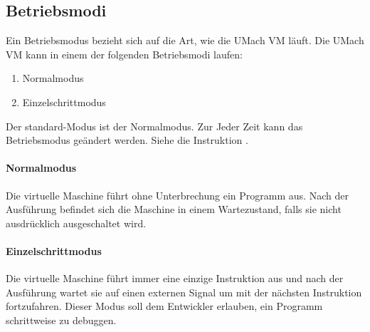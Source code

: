 \subsection{Betriebsmodi}
\label{subsec:Betriebsmodi}
Ein \gls{Betriebsmodus} bezieht sich auf die Art, wie die UMach VM läuft.
Die UMach VM kann in einem der folgenden Betriebsmodi laufen:

\begin{enumerate}
  \item Normalmodus
  \item Einzelschrittmodus
\end{enumerate}

Der standard-Modus ist der Normalmodus.
Zur Jeder Zeit kann das Betriebsmodus geändert werden. Siehe die Instruktion 
.

\paragraph{Normalmodus} Die virtuelle Maschine führt ohne Unterbrechung ein
Programm aus. Nach der Ausführung befindet sich die Maschine in einem
Wartezustand, falls sie nicht ausdrücklich ausgeschaltet wird.

\paragraph{Einzelschrittmodus} Die virtuelle Maschine führt immer eine einzige
Instruktion aus und nach der Ausführung wartet sie auf einen externen Signal um
mit der nächsten Instruktion fortzufahren. Dieser Modus soll dem Entwickler
erlauben, ein Programm schrittweise zu debuggen.


